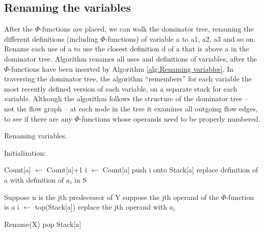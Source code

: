 \subsection{Renaming the variables}

After the $\Phi$-functions are placed, we can walk the dominator tree, renaming the different definitions (including $\Phi$-functions) of variable a to a1, a2, a3 and so on. Rename each use of a to use the closest definition d of a that is above a in the dominator tree. Algorithm  renames all uses and definitions of variables, after the $\Phi$-functions have been inserted by Algorithm \ref{alg:Renaming variables}. In traversing the dominator tree, the algorithm “remembers” for each variable the most recently defined version of each variable, on a separate stack for each variable. Although the algorithm follows the structure of the dominator tree – not the flow graph – at each node in the tree it examines all outgoing flow edges, to see if there are any $\Phi$-functions whose operands need to be properly numbered.



\begin{algorithm}
	\caption{Renaming variables.}\label{alg:Renaming variables}
	\begin{algorithmic}
		\State Initialization:

		\EndFor

		\EndFor
		\EndIf

		\State Count[a] $\gets$ Count[a]+1
		\State i $\gets$ Count[a]
		\State push i onto Stack[a]
		\State replace definition of a with definition of $a_i$ in S
		\EndFor
		\EndFor

		\State Suppose n is the jth predecessor of Y
		\State suppose the jth operand of the $\Phi$-function is a
		\State i $\gets$ top(Stack[a])
		\State replace the jth operand with $a_i$

		\EndFor
		\EndFor
		\State Rename(X)
		\EndFor
		\State pop Stack[a]
		\EndFor
	\end{algorithmic}
\end{algorithm}

